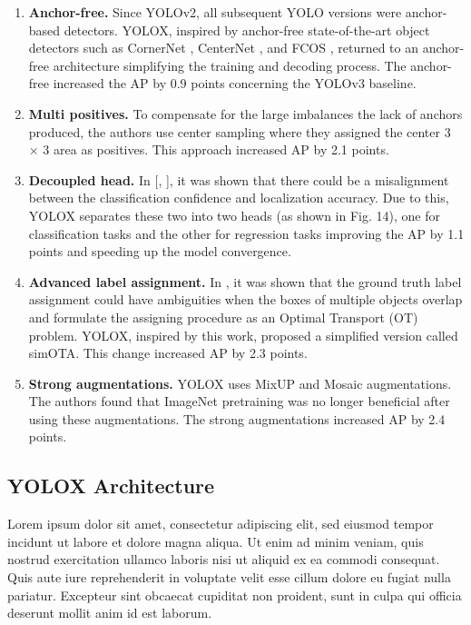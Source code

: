 \documentclass{article}
\begin{document}
\begin{enumerate}
    \item \textbf{Anchor-free.} Since YOLOv2, all subsequent YOLO versions were anchor-based detectors. YOLOX, inspired by anchor-free state-of-the-art object detectors such as CornerNet \cite{law2018cornernet}, CenterNet \cite{duan2019centernet}, and FCOS \cite{tian2019fcos}, returned to an anchor-free architecture simplifying the training and decoding process. The anchor-free increased the AP by 0.9 points concerning the YOLOv3 baseline.
    \item \textbf{Multi positives.} To compensate for the large imbalances the lack of anchors produced, the authors use center sampling \cite{tian2019fcos} where they assigned the center 3 × 3 area as positives. This approach increased AP by 2.1 points.
    \item \textbf{Decoupled head.} In [\cite{song2020revisiting}, \cite{wu2020rethinking}], it was shown that there could be a misalignment between the classification confidence and localization accuracy. Due to this, YOLOX separates these two into two heads (as shown in Fig. 14), one for classification tasks and the other for regression tasks improving the AP by 1.1 points and speeding up the model convergence.
    \item \textbf{Advanced label assignment.} In \cite{ge2021ota}, it was shown that the ground truth label assignment could have ambiguities when the boxes of multiple objects overlap and formulate the assigning procedure as an Optimal Transport (OT) problem. YOLOX, inspired by this work, proposed a simplified version called simOTA. This change increased AP by 2.3 points.
    \item \textbf{Strong augmentations.} YOLOX uses MixUP \cite{zhang2017mixup} and Mosaic augmentations. The authors found that ImageNet pretraining was no longer beneficial after using these augmentations. The strong augmentations increased AP by 2.4 points.
\end{enumerate}



\subsection{YOLOX Architecture}


Lorem ipsum dolor sit amet, consectetur adipiscing elit, sed eiusmod tempor incidunt ut labore et dolore magna aliqua. Ut enim ad minim veniam, quis nostrud exercitation ullamco laboris nisi ut aliquid ex ea commodi consequat. Quis aute iure reprehenderit in voluptate velit esse cillum dolore eu fugiat nulla pariatur. Excepteur sint obcaecat cupiditat non proident, sunt in culpa qui officia deserunt mollit anim id est laborum.
\end{document}
